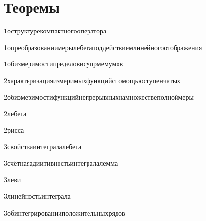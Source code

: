 







\section{Теоремы}

{1}{оструктурекомпактногооператора}

{1}{опреобразованиимерылебегаподдействиемлинейногоотображения}

{1}{обизмеримостипределовисупрмемумов}

{2}{характеризацияизмеримыхфункцийспомощьюступенчатых}

{2}{обизмеримостифункцийнепрерывныхнамножествеполноймеры}

{2}{лебега}

{2}{рисса}

{3}{свойстваинтегралалебега}

{3}{счётнаяадиитивностьинтегралалемма}

{3}{леви}

{3}{линейностьинтеграла}

{3}{обинтегрированииположительныхрядов}

